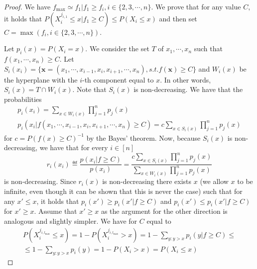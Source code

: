 \begin{proof}
We have $f_\text{max} \simeq f_1 | f_1 \geq f_i, i \in \{2,3,\cdots,n\}$. We prove that for any value $C$, it holds that $P(X_i^{j_{i,1}} \leq x | f_1 \geq C) \leq P(X_i \leq x)$ and then set $C = \max(f_i, i \in \{2,3,\cdots,n\})$.

Let $p_i(x) = P(X_i=x)$. We consider the set $T$ of $x_1, \cdots, x_n$ such that $f(x_1, \cdots, x_n) \geq C$. Let $S_i(x_i) = \{\mathbf{x} = (x_1, \cdots, x_{i-1}, x_{i}, x_{i+1}, \cdots, x_n), s.t. f(\mathbf{x}) \geq C\}$ and $W_i(x)$ be the hyperplane with the $i$-th component equal to $x$. In other words, $S_i(x) = T \cap W_i(x)$. Note that $S_i(x)$ is non-decreasing. We have that the probabilities
\begin{gather}
p_i(x_i) = \sum_{x\in W_i(x)} \prod_{j=1}^n p_j(x) \\
p_i(x_i | f(x_1, \cdots, x_{i-1}, x_{i}, x_{i+1}, \cdots, x_n) \geq C) = c\sum_{x\in S_i(x)} \prod_{j=1}^n p_j(x)
\end{gather}
for $c = P(f(x) \geq C)^{-1}$ by the Bayes' theorem. Now, because $S_i(x)$ is non-decreasing, we have that for every $i \in [n]$
\[
r_i(x_i) \eqdef \frac{p(x_i | f \geq C)}{p(x_i)} = \frac{c\sum_{x\in S_i(x)} \prod_{j=1}^n p_j(x)}{\sum_{x\in W_i(x)} \prod_{j=1}^n p_j(x)}
\]
is non-decreasing. Since $r_i(x)$ is non-decreasing there exists $x$ (we allow $x$ to be infinite, even though it can be shown that this is never the case) such that for any $x' \leq x$, it holds that $p_i(x') \geq p_i(x' | f \geq C)$ and $p_i(x') \leq p_i(x' | f \geq C)$ for $x' \geq x$. Assume that $x' \geq x$ as the argument for the other direction is analogous and slightly simpler. We have for $C$ equal to 
\begin{gather}
P(X_i^{j_{i,l_\text{max}}} \leq x) = 1-P(X_i^{j_{i,l_\text{max}}} > x) = 1-\sum_{y:y>x} p_i(y | f \geq C) \leq \\ \leq 1-\sum_{y:y>x} p_i(y) = 1-P(X_i > x) = P(X_i \leq x)
\end{gather}
\end{proof}

